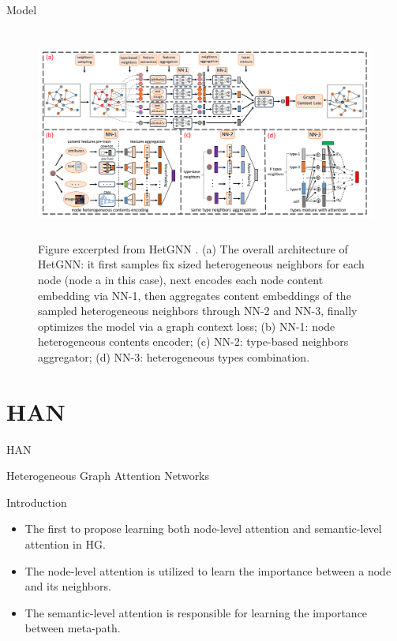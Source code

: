 \documentclass[aspectratio=1610,xcolor={dvipsnames},hyperref={colorlinks,unicode,linkcolor=violet,anchorcolor=blueviolet,citecolor=YellowOrange,filecolor=black,urlcolor=Aquamarine}]{beamer}
\begin{document}
\begin{frame}[label={sec:org2bc9cad}]{Model}
\begin{figure}[htbp]
\centering
\includegraphics[height=7cm]{./p3.png}
\caption{\tiny Figure excerpted from HetGNN \autocite{zhangHeterogeneousGraphNeural2019}.  (a) The overall architecture of HetGNN: it first samples fix sized heterogeneous neighbors for each node (node a in this case), next encodes each node content embedding via NN-1, then aggregates content embeddings of the sampled heterogeneous neighbors through NN-2 and NN-3, finally optimizes the model via a graph context loss; (b) NN-1: node heterogeneous contents encoder; (c) NN-2: type-based neighbors aggregator; (d) NN-3: heterogeneous types combination.}
\end{figure}
\end{frame}

\section{HAN}
\label{sec:org78ce918}

\begin{frame}[label={sec:org5cd90ac}]{HAN}
\begin{center}
\Huge Heterogeneous Graph Attention Networks
\end{center}

\textcite{wangHeterogeneousGraphAttention2019}
\end{frame}

\begin{frame}[label={sec:orgcd95458}]{Introduction}
\begin{itemize}
\item The first to propose learning both node-level attention and
semantic-level attention in HG.
\item The node-level attention is utilized to learn the importance between
a node and its neighbors.
\item The semantic-level attention is responsible for learning the
importance between meta-path.
\end{itemize}
\end{frame}
\end{document}
